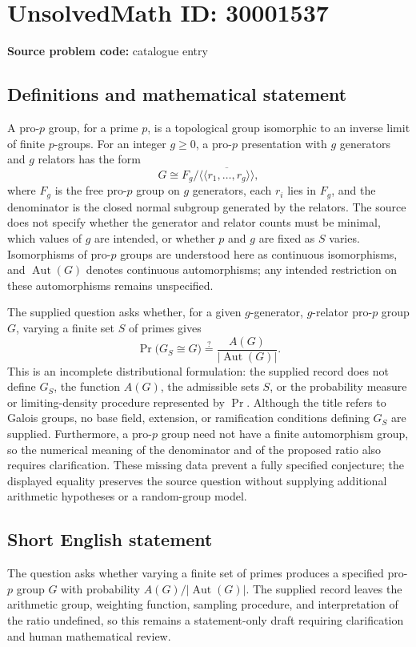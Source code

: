 \documentclass[11pt]{article}
\begin{document}
\section*{UnsolvedMath ID: 30001537}
\textbf{Source problem code:} catalogue entry
\subsection{Definitions and mathematical statement}
A pro-$p$ group, for a prime $p$, is a topological group isomorphic to an inverse limit of finite $p$-groups. For an integer $g\geq 0$, a pro-$p$ presentation with $g$ generators and $g$ relators has the form
\[
G\cong F_g/\overline{\langle\!\langle r_1,\ldots,r_g\rangle\!\rangle},
\]
where $F_g$ is the free pro-$p$ group on $g$ generators, each $r_i$ lies in $F_g$, and the denominator is the closed normal subgroup generated by the relators. The source does not specify whether the generator and relator counts must be minimal, which values of $g$ are intended, or whether $p$ and $g$ are fixed as $S$ varies. Isomorphisms of pro-$p$ groups are understood here as continuous isomorphisms, and $\operatorname{Aut}(G)$ denotes continuous automorphisms; any intended restriction on these automorphisms remains unspecified.

The supplied question asks whether, for a given $g$-generator, $g$-relator pro-$p$ group $G$, varying a finite set $S$ of primes gives
\[
\Pr\bigl(G_S\cong G\bigr)\stackrel{?}{=}\frac{A(G)}{|\operatorname{Aut}(G)|}.
\]
This is an incomplete distributional formulation: the supplied record does not define $G_S$, the function $A(G)$, the admissible sets $S$, or the probability measure or limiting-density procedure represented by $\Pr$. Although the title refers to Galois groups, no base field, extension, or ramification conditions defining $G_S$ are supplied. Furthermore, a pro-$p$ group need not have a finite automorphism group, so the numerical meaning of the denominator and of the proposed ratio also requires clarification. These missing data prevent a fully specified conjecture; the displayed equality preserves the source question without supplying additional arithmetic hypotheses or a random-group model.
\subsection{Short English statement}
The question asks whether varying a finite set of primes produces a specified pro-$p$ group $G$ with probability $A(G)/|\operatorname{Aut}(G)|$. The supplied record leaves the arithmetic group, weighting function, sampling procedure, and interpretation of the ratio undefined, so this remains a statement-only draft requiring clarification and human mathematical review.
\end{document}
